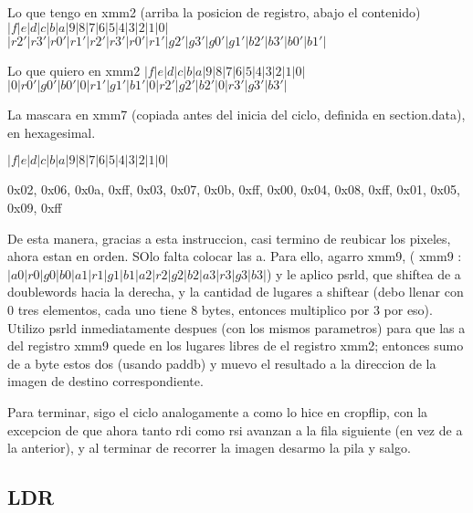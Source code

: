 \documentclass[a4paper]{article}
\begin{document}
    Lo que tengo en xmm2 (arriba la posicion de registro, abajo el contenido)
    \hfill \break
 $|  f  |  e  |  d  |  c  |  b  |  a  |  9  |  8  |  7  |  6  |  5  |  4  |  3  |  2  |  1  |  0  |$
 \hfill \break
$ | r2' | r3' | r0' | r1' | r2' | r3' | r0' | r1' | g2' | g3' | g0' | g1' | b2' | b3' | b0' | b1' | $
 \hfill \break
 
 Lo que quiero en xmm2  
 \hfill \break
 $|  f  |  e  |  d  |  c  |  b  |  a  |  9  |  8  |  7  |  6  |  5  |  4  |  3  |  2  |  1  |  0  |$
 \hfill \break
$ |  0  | r0' | g0' | b0' |  0  | r1' | g1' | b1' |  0  | r2' | g2' | b2' |  0  | r3' | g3' | b3' |$
\hfill \break

La mascara en xmm7 (copiada antes del inicia del ciclo, definida en section.data), en hexagesimal.
\hfill \break


$ |  f  |  e  |  d  |  c  |  b  |  a  |  9  |  8  |  7  |  6  |  5  |  4  |  3  |  2  |  1  |  0  |$
\hfill \break

 0x02, 0x06, 0x0a, 0xff, 0x03, 0x07, 0x0b, 0xff, 0x00, 0x04, 0x08, 0xff, 0x01, 0x05, 0x09, 0xff
 \hfill \break
 
 
De esta manera, gracias a esta instruccion, casi termino de reubicar los pixeles, ahora estan en orden. SOlo falta colocar las a. Para ello, agarro xmm9, 
( xmm9 : $| a0 | r0 | g0 | b0 | a1 | r1 | g1 | b1 | a2 | r2 | g2 | b2 | a3 | r3 | g3 | b3 |$) y le aplico  psrld, que shiftea de a doublewords  hacia la derecha, y  
 la cantidad de lugares a shiftear (debo llenar con 0 tres elementos, cada uno tiene 8 bytes, entonces multiplico por 3 por  eso).
 \hfill \break 
 Utilizo psrld inmediatamente despues (con los mismos parametros) para que las a del registro xmm9 quede en los lugares libres de el registro xmm2; entonces sumo de a byte estos dos (usando paddb) y muevo el resultado a la direccion de la imagen de destino correspondiente.
 \hfill \break
 
 Para terminar, sigo el ciclo analogamente a como lo hice en cropflip, con la excepcion de que ahora tanto rdi como rsi avanzan a la fila siguiente (en vez de  a la anterior), y al terminar de recorrer la imagen desarmo la pila y salgo.
 \hfill \break
 

 

    	
    	
    	  
   
     
    
    
	



\subsection{LDR}
\end{document}
